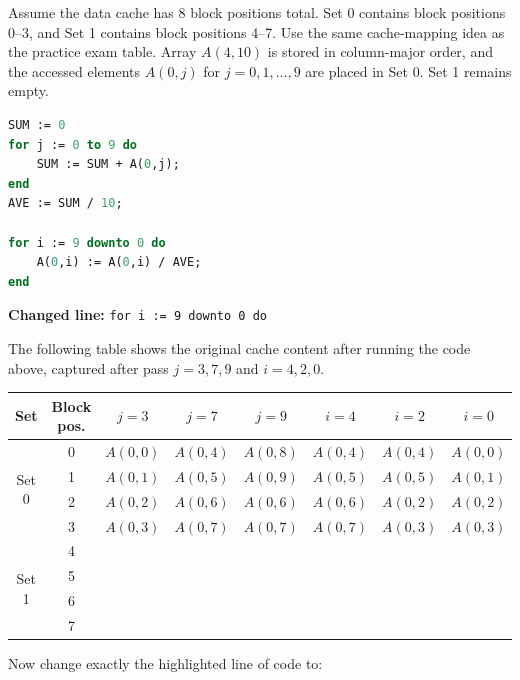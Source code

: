 \documentclass[a4paper,12pt]{article}
\begin{document}
\vspace{0.2cm}
Assume the data cache has 8 block positions total. Set 0 contains block positions 0--3, and Set 1 contains block positions 4--7. Use the same cache-mapping idea as the practice exam table. Array $A(4,10)$ is stored in column-major order, and the accessed elements $A(0,j)$ for $j=0,1,\ldots,9$ are placed in Set 0. Set 1 remains empty.

\begin{lstlisting}[language=Pascal]
SUM := 0
for j := 0 to 9 do
    SUM := SUM + A(0,j);
end
AVE := SUM / 10;

for i := 9 downto 0 do
    A(0,i) := A(0,i) / AVE;
end
\end{lstlisting}

\begin{center}
\colorbox{yellow!25}{\parbox{0.82\textwidth}{\centering
\textbf{Changed line:} \texttt{for i := 9 downto 0 do}
}}
\end{center}

The following table shows the original cache content after running the code above, captured after pass $j=3,7,9$ and $i=4,2,0$.

\begin{center}
\scriptsize
\begin{tabular}{|c|c|c|c|c|c|c|c|}
\hline
\textbf{Set} & \textbf{Block pos.} & \textbf{$j=3$} & \textbf{$j=7$} & \textbf{$j=9$} & \textbf{$i=4$} & \textbf{$i=2$} & \textbf{$i=0$} \\
\hline
\multirow{4}{*}{Set 0} & 0 & $A(0,0)$ & $A(0,4)$ & $A(0,8)$ & $A(0,4)$ & $A(0,4)$ & $A(0,0)$ \\
\cline{2-8}
& 1 & $A(0,1)$ & $A(0,5)$ & $A(0,9)$ & $A(0,5)$ & $A(0,5)$ & $A(0,1)$ \\
\cline{2-8}
& 2 & $A(0,2)$ & $A(0,6)$ & $A(0,6)$ & $A(0,6)$ & $A(0,2)$ & $A(0,2)$ \\
\cline{2-8}
& 3 & $A(0,3)$ & $A(0,7)$ & $A(0,7)$ & $A(0,7)$ & $A(0,3)$ & $A(0,3)$ \\
\hline
\multirow{4}{*}{Set 1} & 4 & & & & & & \\
\cline{2-8}
& 5 & & & & & & \\
\cline{2-8}
& 6 & & & & & & \\
\cline{2-8}
& 7 & & & & & & \\
\hline
\end{tabular}
\end{center}

Now change exactly the highlighted line of code to:
\end{document}
